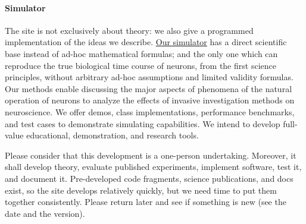 \paragraph*{Simulator}The site is not exclusively about theory: we also give a programmed implementation of the ideas we describe.
\href{../../doxy/HTML/index.html}{Our simulator}
has a direct scientific base instead of ad-hoc mathematical formulas;
and the only one which can reproduce 
the true biological time course
of neurons,
from the first science principles, without arbitrary ad-hoc assumptions and limited validity formulas.
Our methods enable discussing the major aspects of phenomena of the natural operation of neurons
to analyze the effects of invasive %
investigation methods on neuroscience.
We offer demos, class implementations, performance benchmarks, and test cases
to demonstrate simulating capabilities. We intend to develop full-value
educational, demonstration, and research tools. 


\warningbox
{Please consider that this development is a one-person undertaking.
Moreover, it shall develop theory, evaluate published experiments, implement software, test it, and document it.
Pre-developed code fragments, science publications, and docs exist, so the site develops relatively quickly,
but we need time to put them together consistently.  Please return later and see if something is new (see the date and the version).
}



